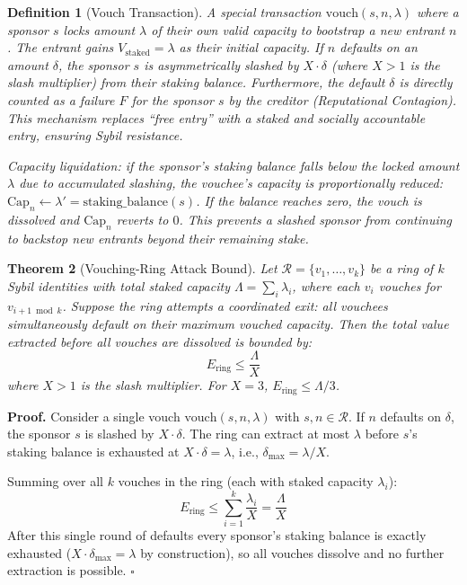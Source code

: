 \documentclass[11pt]{article}
\newtheorem{theorem}{Theorem}[section]
\newtheorem{definition}[theorem]{Definition}
\newcommand{\qed}{\hfill}
\newenvironment{proof}{\noindent\textbf{Proof.}}{\qed$\square$\par\medskip}
\begin{document}
\begin{definition}[Vouch Transaction]
A special transaction $\text{vouch}(s, n, \lambda)$ where a sponsor $s$ locks amount $\lambda$ of their own valid capacity to bootstrap a new entrant $n$. The entrant gains $V_{\text{staked}} = \lambda$ as their initial capacity. If $n$ defaults on an amount $\delta$, the sponsor $s$ is asymmetrically slashed by $X \cdot \delta$ (where $X > 1$ is the \emph{slash multiplier}) from their staking balance. Furthermore, the default $\delta$ is directly counted as a failure $F$ for the sponsor $s$ by the creditor (Reputational Contagion). This mechanism replaces ``free entry'' with a staked and socially accountable entry, ensuring Sybil resistance.

\emph{Capacity liquidation}: if the sponsor's staking balance falls below the locked amount $\lambda$ due to accumulated slashing, the vouchee's capacity is proportionally reduced: $\text{Cap}_n \leftarrow \lambda' = \text{staking\_balance}(s)$. If the balance reaches zero, the vouch is dissolved and $\text{Cap}_n$ reverts to $0$. This prevents a slashed sponsor from continuing to backstop new entrants beyond their remaining stake.
\end{definition}

\begin{theorem}[Vouching-Ring Attack Bound]\label{thm:vouch_ring}
Let $\mathcal{R} = \{v_1, \ldots, v_k\}$ be a ring of $k$ Sybil identities with total staked capacity $\Lambda = \sum_{i} \lambda_i$, where each $v_i$ vouches for $v_{i+1 \bmod k}$. Suppose the ring attempts a coordinated exit: all vouchees simultaneously default on their maximum vouched capacity. Then the total value extracted before all vouches are dissolved is bounded by:
\begin{equation}
    E_{\text{ring}} \leq \frac{\Lambda}{X}
\end{equation}
where $X > 1$ is the slash multiplier. For $X = 3$, $E_{\text{ring}} \leq \Lambda / 3$.
\end{theorem}

\begin{proof}
Consider a single vouch $\text{vouch}(s, n, \lambda)$ with $s, n \in \mathcal{R}$. If $n$ defaults on $\delta$, the sponsor $s$ is slashed by $X \cdot \delta$. The ring can extract at most $\lambda$ before $s$'s staking balance is exhausted at $X \cdot \delta = \lambda$, i.e., $\delta_{\max} = \lambda / X$.

Summing over all $k$ vouches in the ring (each with staked capacity $\lambda_i$):
\[
    E_{\text{ring}} \leq \sum_{i=1}^k \frac{\lambda_i}{X} = \frac{\Lambda}{X}
\]
After this single round of defaults every sponsor's staking balance is exactly exhausted ($X \cdot \delta_{\max} = \lambda$ by construction), so all vouches dissolve and no further extraction is possible. \qed
\end{proof}
\end{document}
